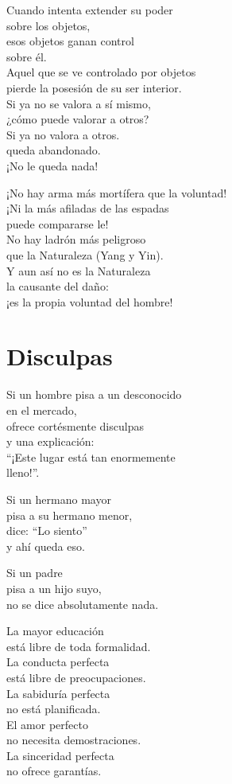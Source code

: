\documentclass[hidelinks]{memoir}
\begin{document}
	Cuando intenta extender su poder\\
	sobre los objetos,\\
	esos objetos ganan control\\
	sobre él.\\
	Aquel que se ve controlado por objetos\\
	pierde la posesión de su ser interior.\\
	Si ya no se valora a sí mismo,\\
	¿cómo puede valorar a otros?\\
	Si ya no valora a otros.\\
	queda abandonado.\\
	¡No le queda nada!
	
	¡No hay arma más mortífera que la voluntad!\\
	¡Ni la más afiladas de las espadas\\
	puede compararse le!\\
	No hay ladrón más peligroso\\
	que la Naturaleza (Yang y Yin).\\
	Y aun así no es la Naturaleza\\
	la causante del daño:\\
	¡es la propia voluntad del hombre!
	
	\chapter*{Disculpas}
	
	Si un hombre pisa a un desconocido\\
	en el mercado,\\
	ofrece cortésmente disculpas\\
	y una explicación:\\
	``¡Este lugar está tan enormemente\\
	lleno!''.
	
	Si un hermano mayor\\
	pisa a su hermano menor,\\
	dice: ``Lo siento''\\
	y ahí queda eso.
	
	Si un padre\\
	pisa a un hijo suyo,\\
	no se dice absolutamente nada.
	
	La mayor educación\\
	está libre de toda formalidad.\\
	La conducta perfecta\\
	está libre de preocupaciones.\\
	La sabiduría perfecta\\
	no está planificada.\\
	El amor perfecto\\
	no necesita demostraciones.\\
	La sinceridad perfecta\\
	no ofrece garantías.
	
\end{document}
